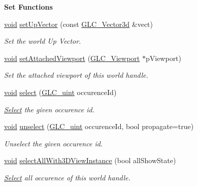 \begin{Indent}{\bf Set Functions}
\begin{DoxyCompactItemize}
\hyperlink{group___u_a_v_objects_plugin_ga444cf2ff3f0ecbe028adce838d373f5c}{void} \hyperlink{class_g_l_c___world_handle_ae4a79b98e7ff3db2864b0b023cc3263e}{set\-Up\-Vector} (const \hyperlink{class_g_l_c___vector3d}{G\-L\-C\-\_\-\-Vector3d} \&vect)
\begin{DoxyCompactList}\small\item\em Set the world Up Vector. \end{DoxyCompactList}\item 
\hyperlink{group___u_a_v_objects_plugin_ga444cf2ff3f0ecbe028adce838d373f5c}{void} \hyperlink{class_g_l_c___world_handle_a841ad2f8d23e1c169e080394a2dd7df6}{set\-Attached\-Viewport} (\hyperlink{class_g_l_c___viewport}{G\-L\-C\-\_\-\-Viewport} $\ast$p\-Viewport)
\begin{DoxyCompactList}\small\item\em Set the attached viewport of this world handle. \end{DoxyCompactList}\item 
\hyperlink{group___u_a_v_objects_plugin_ga444cf2ff3f0ecbe028adce838d373f5c}{void} \hyperlink{class_g_l_c___world_handle_acf31fb75c3395e4678ae23f13cffb979}{select} (\hyperlink{glc__global_8h_abf950976fabed69026558df8e2da6c6b}{G\-L\-C\-\_\-uint} occurence\-Id)
\begin{DoxyCompactList}\small\item\em \hyperlink{class_select}{Select} the given occurence id. \end{DoxyCompactList}\item 
\hyperlink{group___u_a_v_objects_plugin_ga444cf2ff3f0ecbe028adce838d373f5c}{void} \hyperlink{class_g_l_c___world_handle_acfba405bd828e7b66e63b3cb1815ddb0}{unselect} (\hyperlink{glc__global_8h_abf950976fabed69026558df8e2da6c6b}{G\-L\-C\-\_\-uint} occurence\-Id, bool propagate=true)
\begin{DoxyCompactList}\small\item\em Unselect the given occurence id. \end{DoxyCompactList}\item 
\hyperlink{group___u_a_v_objects_plugin_ga444cf2ff3f0ecbe028adce838d373f5c}{void} \hyperlink{class_g_l_c___world_handle_ad70e886ed03340912a09194724c71f1a}{select\-All\-With3\-D\-View\-Instance} (bool all\-Show\-State)
\begin{DoxyCompactList}\small\item\em \hyperlink{class_select}{Select} all occurence of this world handle. \end{DoxyCompactList}\item 

\end{DoxyCompactItemize}
\end{Indent}
